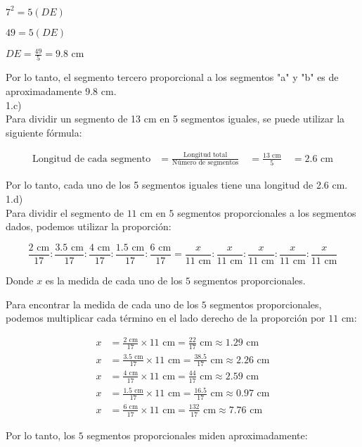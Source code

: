 \documentclass{article}
\begin{document}
$7^2 = 5(DE)$

$49 = 5(DE)$

$DE = \frac{49}{5} = 9.8\text{ cm}$

Por lo tanto, el segmento tercero proporcional a los segmentos "a" y "b" es de aproximadamente 9.8 cm.
\\
{\Large 1.c)}
\\
Para dividir un segmento de 13 cm en 5 segmentos iguales, se puede utilizar la siguiente fórmula:

\begin{align*}
\text{Longitud de cada segmento} &= \frac{\text{Longitud total}}{\text{Número de segmentos}} \
&= \frac{13\text{ cm}}{5} \
&= 2.6\text{ cm}
\end{align*}

Por lo tanto, cada uno de los 5 segmentos iguales tiene una longitud de 2.6 cm.
\\
{\Large 1.d)}
\\
Para dividir el segmento de $11$ cm en $5$ segmentos proporcionales a los segmentos dados, podemos utilizar la proporción:

$$\frac{2\text{ cm}}{17} : \frac{3.5\text{ cm}}{17} : \frac{4\text{ cm}}{17} : \frac{1.5\text{ cm}}{17} : \frac{6\text{ cm}}{17} = \frac{x}{11\text{ cm}} : \frac{x}{11\text{ cm}} : \frac{x}{11\text{ cm}} : \frac{x}{11\text{ cm}} : \frac{x}{11\text{ cm}}$$

Donde $x$ es la medida de cada uno de los $5$ segmentos proporcionales.

Para encontrar la medida de cada uno de los $5$ segmentos proporcionales, podemos multiplicar cada término en el lado derecho de la proporción por $11$ cm:

$$\begin{aligned}
	x &= \frac{2\text{ cm}}{17} \times 11\text{ cm} = \frac{22}{17}\text{ cm} \approx 1.29\text{ cm} \\
	x &= \frac{3.5\text{ cm}}{17} \times 11\text{ cm} = \frac{38.5}{17}\text{ cm} \approx 2.26\text{ cm} \\
	x &= \frac{4\text{ cm}}{17} \times 11\text{ cm} = \frac{44}{17}\text{ cm} \approx 2.59\text{ cm} \\
	x &= \frac{1.5\text{ cm}}{17} \times 11\text{ cm} = \frac{16.5}{17}\text{ cm} \approx 0.97\text{ cm} \\
	x &= \frac{6\text{ cm}}{17} \times 11\text{ cm} = \frac{132}{17}\text{ cm} \approx 7.76\text{ cm}
\end{aligned}$$

Por lo tanto, los $5$ segmentos proporcionales miden aproximadamente:
\end{document}
